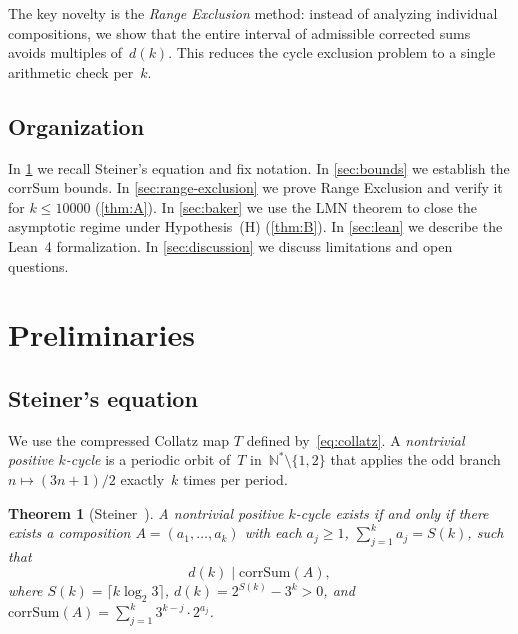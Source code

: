 \documentclass[11pt, a4paper]{amsart}
\theoremstyle{plain}
\newtheorem{theorem}{Theorem}[section]
\theoremstyle{definition}
\theoremstyle{remark}
\newcommand{\N}{\mathbb{N}}
\newcommand{\corrSum}{\mathrm{corrSum}}
\begin{document}
The key novelty is the \emph{Range Exclusion} method: instead of
analyzing individual compositions, we show that the entire interval
of admissible corrected sums avoids multiples of~$d(k)$.  This
reduces the cycle exclusion problem to a single arithmetic check per~$k$.

\subsection{Organization}\label{ssec:organization}

In \cref{sec:prelim} we recall Steiner's equation and fix notation.
In \cref{sec:bounds} we establish the corrSum bounds.
In \cref{sec:range-exclusion} we prove Range Exclusion and
verify it for $k \leq 10000$ (\cref{thm:A}).
In \cref{sec:baker} we use the LMN theorem to close the
asymptotic regime under Hypothesis~(H) (\cref{thm:B}).
In \cref{sec:lean} we describe the Lean~4 formalization.
In \cref{sec:discussion} we discuss limitations and open questions.

\section{Preliminaries}\label{sec:prelim}

\subsection{Steiner's equation}\label{ssec:steiner}

We use the compressed Collatz map $T$ defined by~\eqref{eq:collatz}.
A \emph{nontrivial positive $k$-cycle} is a periodic orbit of~$T$
in~$\N^* \setminus \{1, 2\}$ that applies the odd branch
$n \mapsto (3n+1)/2$ exactly~$k$ times per period.

\begin{theorem}[Steiner~\cite{Steiner1977}]\label{thm:steiner}
  A nontrivial positive $k$-cycle exists if and only if
  there exists a composition $A = (a_1, \ldots, a_k)$ with
  each $a_j \geq 1$, $\sum_{j=1}^k a_j = S(k)$, such that
  \begin{equation}\label{eq:steiner}
    d(k) \;\Big|\; \corrSum(A),
  \end{equation}
  where $S(k) = \lceil k \log_2 3 \rceil$,
  $d(k) = 2^{S(k)} - 3^k > 0$, and
  $\corrSum(A) = \sum_{j=1}^{k} 3^{k-j} \cdot 2^{a_j}$.
\end{theorem}
\end{document}
